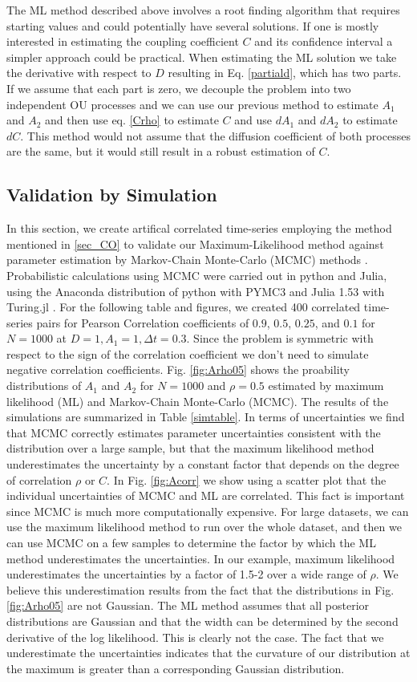 \documentclass[%
 reprint,
 amsmath,amssymb,
 aps,
]{revtex4-1}
\begin{document}
The ML method described above involves a root finding algorithm that requires starting values and could potentially have several solutions.  If one is mostly interested in estimating the coupling coefficient $C$ and its confidence interval a simpler approach could be practical.  When estimating the ML solution we take the derivative with respect to $D$ resulting in Eq. \ref{partiald}, which has two parts.  If we assume that each part is zero, we decouple the problem into two independent OU processes and we can use our previous method \cite{RN91} to estimate $A_1$ and $A_2$ and then use eq. \ref{Crho} to estimate $C$ and use $dA_1$ and $dA_2$ to estimate $dC$.  This method would not assume that the diffusion coefficient of both processes are the same, but it would still result in a robust estimation of $C$.
\subsection{Validation by Simulation}
In this section, we create artifical correlated time-series employing the method mentioned in \ref{sec_CO} to validate our Maximum-Likelihood method against parameter estimation by Markov-Chain Monte-Carlo (MCMC) methods \cite{RN46}.  Probabilistic calculations using MCMC were carried out in python and Julia, using the Anaconda distribution of python \cite{anaconda} with PYMC3 \cite{RN75} and Julia 1.53 \cite{bezanson2017julia} with Turing.jl \cite{ge2018t}.  For the following table and figures, we created 400 correlated time-series pairs for Pearson Correlation coefficients of $0.9$, $0.5$, $0.25$, and $0.1$ for $N=1000$ at $D=1,A_{1}=1,\Delta t = 0.3$.  Since the problem is symmetric with respect to the sign of the correlation coefficient we don't need to simulate negative correlation coefficients. Fig. \ref{fig:Arho05} shows the proability distributions of $A_1$ and $A_2$ for $N=1000$ and $\rho=0.5$ estimated by maximum likelihood (ML) and Markov-Chain Monte-Carlo (MCMC). The results of the simulations are summarized in Table \ref{simtable}.  In terms of uncertainties we find that MCMC correctly estimates parameter uncertainties consistent with the distribution over a large sample, but that the maximum likelihood method underestimates the uncertainty by a constant factor that depends on the degree of correlation $\rho$ or $C$. In Fig. \ref{fig:Acorr} we show using a scatter plot that the individual uncertainties of MCMC and ML are correlated.  This fact is important since MCMC is much more computationally expensive.  For large datasets, we can use the maximum likelihood method to run over the whole dataset, and then we can use MCMC on a few samples to determine the factor by which the ML method underestimates the uncertainties.  In our example, maximum likelihood underestimates the uncertainties by a factor of 1.5-2 over a wide range of $\rho$.  We believe this underestimation results from the fact that the distributions in Fig. \ref{fig:Arho05} are not Gaussian.  The ML method assumes that all posterior distributions are Gaussian and that the width can be determined by the second derivative of the log likelihood.  This is clearly not the case.  The fact that we underestimate the uncertainties indicates that the curvature of our distribution at the maximum is greater than a corresponding Gaussian distribution.
\end{document}
